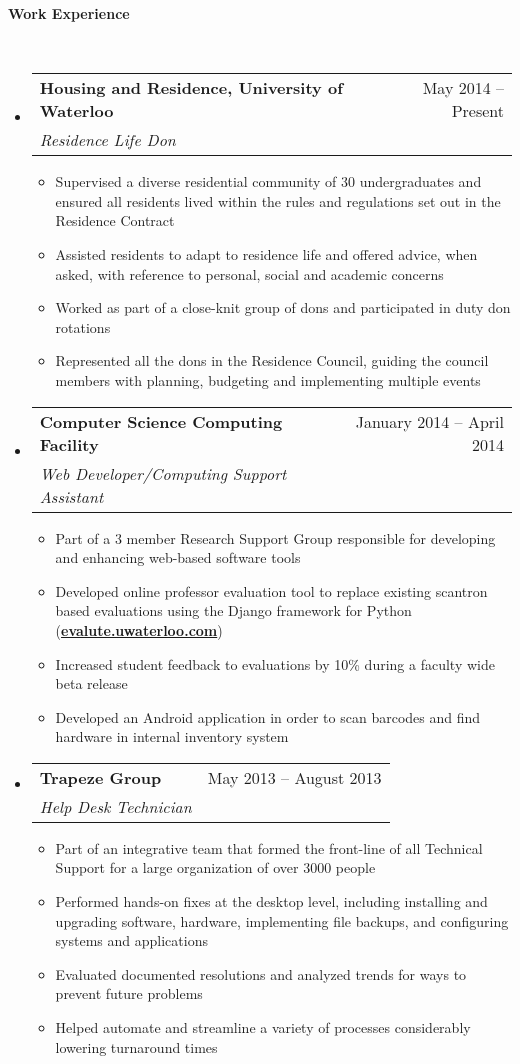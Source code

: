 \documentclass[letterpaper,11pt]{article}
\makeatletter
\newcommand{\resitem}[1]{\item #1 \vspace{-2pt}}
\newcommand{\resheading}[1]{{\large \colorbox{mygrey}{\begin{minipage}{\textwidth}{\textbf{#1 \vphantom{p\^{E}}}}\end{minipage}}}}
\newcommand{\ressubheading}[4]{
\begin{tabular*}{6.5in}{l@{\extracolsep{\fill}}r}
		\textbf{#1} & #2 \\
		\textit{#3} & \textit{#4} \\
\end{tabular*}\vspace{-6pt}}
\makeatother
\begin{document}
\vspace{0.1in}
\resheading{Work Experience}
\\[20pt]
	\begin{itemize} \itemsep 15pt
		\item 
			\ressubheading{Housing and Residence, University of Waterloo}{May 2014 -- Present}{Residence Life Don}{}
				{ \normalsize
				\begin{itemize} \itemsep 4pt
					\resitem{Supervised a diverse residential community of 30 undergraduates and ensured all residents lived within the rules and regulations set out in the Residence Contract}				
					\resitem{Assisted residents to adapt to residence life and offered advice, when asked, with reference to personal, social and academic concerns}
					\resitem{Worked as part of a close-knit group of dons and participated in duty don rotations}
					\resitem{Represented all the dons in the Residence Council, guiding the council members with planning, budgeting and implementing multiple events}
				\end{itemize}
				}
		\item 
			\ressubheading{Computer Science Computing Facility}{January 2014 -- April 2014}{Web Developer/Computing Support Assistant}{}
				{ \normalsize
				\begin{itemize} \itemsep 4pt
					\resitem{Part of a 3 member Research Support Group responsible for developing and enhancing web-based software tools}	
					\resitem{Developed online professor evaluation tool to replace existing scantron based evaluations using the Django framework for Python (\href{http://evalute.uwaterloo.com}{\textbf {evalute.uwaterloo.com}})}
					\resitem{Increased student feedback to evaluations by 10\% during a faculty wide beta release }
					\resitem{Developed an Android application in order to scan barcodes and find hardware in internal inventory system}						
				\end{itemize}
				}
		\item 
			\ressubheading{Trapeze Group}{May 2013 -- August 2013}{Help Desk Technician}{}
				{ \normalsize
				\begin{itemize} \itemsep 4pt
					\resitem{Part of an integrative team that formed the front-line of all Technical Support for a large organization of over 3000 people}
					\resitem{ Performed hands-on fixes at the desktop level, including installing and upgrading software,  hardware, implementing file backups, and configuring systems and applications}
					\resitem{Evaluated documented resolutions and analyzed trends for ways to prevent future problems}
					\resitem{Helped automate and streamline a variety of processes considerably lowering turnaround times}
				\end{itemize}
				}
\end{itemize}  %
\end{document}
